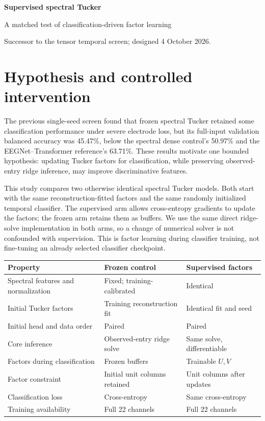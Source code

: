 \documentclass[11pt,a4paper]{article}
\begin{document}
{\LARGE\bfseries\color{navy} Supervised spectral Tucker}\par
{\large A matched test of classification-driven factor learning}\par
Successor to the tensor temporal screen; designed 4 October 2026.

\section{Hypothesis and controlled intervention}
The previous single-seed screen found that frozen spectral Tucker retained some
classification performance under severe electrode loss, but its full-input
validation balanced accuracy was 45.47\%, below the spectral dense control's
50.97\% and the EEGNet--Transformer reference's 63.71\%. These results motivate
one bounded hypothesis: updating Tucker factors for classification, while
preserving observed-entry ridge inference, may improve discriminative features.

This study compares two otherwise identical spectral Tucker models. Both start
with the same reconstruction-fitted factors and the same randomly initialized
temporal classifier. The supervised arm allows cross-entropy gradients to update
the factors; the frozen arm retains them as buffers. We use the same direct
ridge-solve implementation in both arms, so a change of numerical solver is
not confounded with supervision. This is factor learning during classifier
training, not fine-tuning an already selected classifier checkpoint.

\begin{tabularx}{\linewidth}{@{}lYY@{}}\toprule
Property & Frozen control & Supervised factors \\ \midrule
Spectral features and normalization & Fixed; training-calibrated & Identical \\
Initial Tucker factors & Training reconstruction fit & Identical fit and seed \\
Initial head and data order & Paired & Paired \\
Core inference & Observed-entry ridge solve & Same solve, differentiable \\
Factors during classification & Frozen buffers & Trainable $U,V$ \\
Factor constraint & Initial unit columns retained & Unit columns after updates \\
Classification loss & Cross-entropy & Same cross-entropy \\
Training availability & Full 22 channels & Full 22 channels \\ \bottomrule
\end{tabularx}
\end{document}
